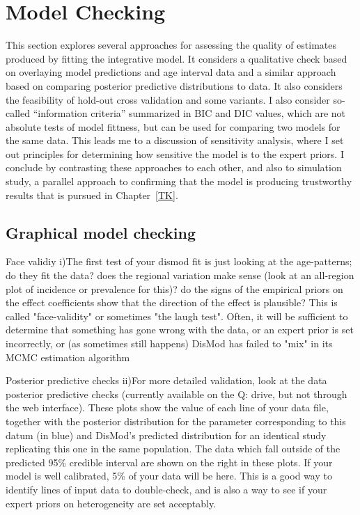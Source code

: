 \section{Model Checking}

This section explores several approaches for assessing the quality of
estimates produced by fitting the integrative model.  It considers a
qualitative check based on overlaying model predictions and age
interval data and a similar approach based on comparing posterior
predictive distributions to data.  It also considers the feasibility
of hold-out cross validation and some variants.  I also consider
so-called ``information criteria'' summarized in BIC and DIC values,
which are not absolute tests of model fittness, but can be used for
comparing two models for the same data.  This leads me to a discussion
of sensitivity analysis, where I set out principles for determining
how sensitive the model is to the expert priors.  I conclude by
contrasting these approaches to each other, and also to simulation
study, a parallel approach to confirming that the model is producing
trustworthy results that is pursued in Chapter~\ref{TK}.

\subsection{Graphical model checking}
Face validiy i)The first test of your dismod fit is just looking at
the age-patterns; do they fit the data?  does the regional variation
make sense (look at an all-region plot of incidence or prevalence for
this)?  do the signs of the empirical priors on the effect
coefficients show that the direction of the effect is plausible?  This
is called "face-validity" or sometimes "the laugh test".  Often, it
will be sufficient to determine that something has gone wrong with the
data, or an expert prior is set incorrectly, or (as sometimes still
happens) DisMod has failed to "mix" in its MCMC estimation algorithm

Posterior predictive checks ii)For more detailed validation, look at
the data posterior predictive checks (currently available on the Q:
drive, but not through the web interface).  These plots show the value
of each line of your data file, together with the posterior
distribution for the parameter corresponding to this datum (in blue)
and DisMod's predicted distribution for an identical study replicating
this one in the same population.  The data which fall outside of the
predicted 95\% credible interval are shown on the right in these
plots.  If your model is well calibrated, 5\% of your data will be
here.  This is a good way to identify lines of input data to
double-check, and is also a way to see if your expert priors on
heterogeneity are set acceptably.


